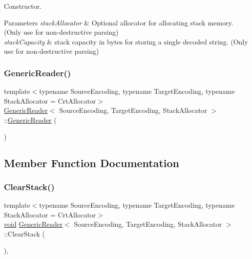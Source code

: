 Constructor. 


\begin{DoxyParams}{Parameters}
{\em stack\+Allocator} & Optional allocator for allocating stack memory. (Only use for non-\/destructive parsing) \\
\hline
{\em stack\+Capacity} & stack capacity in bytes for storing a single decoded string. (Only use for non-\/destructive parsing) \\
\hline
\end{DoxyParams}
\mbox{\label{classGenericReader_ac767384e34b7078fa9f97ba57c884328}} 
\subsubsection{\texorpdfstring{Generic\+Reader()}{GenericReader()}\hspace{0.1cm}{\footnotesize\ttfamily [2/2]}}
{\footnotesize\ttfamily template$<$typename Source\+Encoding, typename Target\+Encoding, typename Stack\+Allocator = Crt\+Allocator$>$ \\
\hyperlink{classGenericReader}{Generic\+Reader}$<$ Source\+Encoding, Target\+Encoding, Stack\+Allocator $>$\+::\hyperlink{classGenericReader}{Generic\+Reader} (\begin{DoxyParamCaption}\item[{const \hyperlink{classGenericReader}{Generic\+Reader}$<$ Source\+Encoding, Target\+Encoding, Stack\+Allocator $>$ \&}]{ }\end{DoxyParamCaption})\hspace{0.3cm}{\ttfamily [private]}}



\subsection{Member Function Documentation}
\mbox{\label{classGenericReader_a1c3db4c395db98714ffb257d559fb28e}} 
\subsubsection{\texorpdfstring{Clear\+Stack()}{ClearStack()}}
{\footnotesize\ttfamily template$<$typename Source\+Encoding, typename Target\+Encoding, typename Stack\+Allocator = Crt\+Allocator$>$ \\
\hyperlink{imgui__impl__opengl3__loader_8h_ac668e7cffd9e2e9cfee428b9b2f34fa7}{void} \hyperlink{classGenericReader}{Generic\+Reader}$<$ Source\+Encoding, Target\+Encoding, Stack\+Allocator $>$\+::Clear\+Stack (\begin{DoxyParamCaption}{ }\end{DoxyParamCaption})\hspace{0.3cm}{\ttfamily [inline]}, {\ttfamily [private]}}

